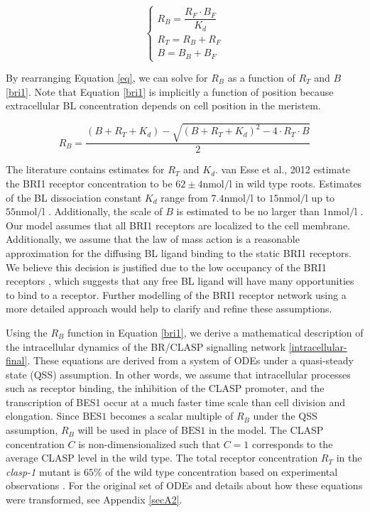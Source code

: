 \documentclass[referee,pdflatex,sn-mathphys-num]{sn-jnl}
\newcommand{\nm}{\unit{\nano\mole\per\litre}}
\begin{document}
\begin{equation}
\begin{cases}
    \label{eq}
    R_{B} = \dfrac{R_{F} \cdot B_{F}}{K_{d}} \\
    R_{T} = R_{B} + R_{F} \\
    B = B_{B} + B_{F} 
\end{cases}
\end{equation}

By rearranging Equation \eqref{eq}, we can solve for $R_{B}$ as a function of $R_{T}$ and $B$ \eqref{bri1}. Note that Equation \eqref{bri1} is implicitly a function of position because extracellular BL concentration depends on cell position in the meristem.

\begin{equation}
\label{bri1}
R_{B} = \frac{(B + R_{T} + K_{d}) - \sqrt{(B + R_{T} + K_{d})^{2} - 4 \cdot  R_{T} \cdot B}}{2}
\end{equation}

The literature contains estimates for $R_{T}$ and $K_{d}$. van Esse et al., 2012 \cite{vanesse2012} estimate the BRI1 receptor concentration to be $62 \pm 4 \nm$ in wild type roots. Estimates of the BL dissociation constant $K_{d}$ range from $7.4 \nm$ to $15 \nm$ \cite{wang2001} up to $55 \nm$ \cite{cano-delgado2004}. Additionally, the scale of $B$ is estimated to be no larger than $1\nm$ \cite{vanesse2012}. Our model assumes that all BRI1 receptors are localized to the cell membrane. Additionally, we assume that the law of mass action is a reasonable approximation for the diffusing BL ligand binding to the static BRI1 receptors. We believe this decision is justified due to the low occupancy of the BRI1 receptors \cite{vanesse2012}, which suggests that any free BL ligand will have many opportunities to bind to a receptor. Further modelling of the BRI1 receptor network using a more detailed approach would help to clarify and refine these assumptions.

Using the $R_{B}$ function in Equation \eqref{bri1}, we derive a mathematical description of the intracellular dynamics of the BR/CLASP signalling network \eqref{intracellular-final}. These equations are derived from a system of ODEs under a quasi-steady state (QSS) assumption. In other words, we assume that intracellular processes such as receptor binding, the inhibition of the CLASP promoter, and the transcription of BES1 occur at a much faster time scale than cell division and elongation. Since $\text{BES1}$ becomes a scalar multiple of $R_{B}$ under the QSS assumption, $R_{B}$ will be used in place of $\text{BES1}$ in the model. The CLASP concentration $C$ is non-dimensionalized such that $C = 1$ corresponds to the average CLASP level in the wild type. The total receptor concentration $R_{T}$ in the \emph{clasp-1} mutant is $65\%$ of the wild type concentration based on experimental observations \cite{ruan2018}. For the original set of ODEs and details about how these equations were transformed, see Appendix \ref{secA2}.
\end{document}
